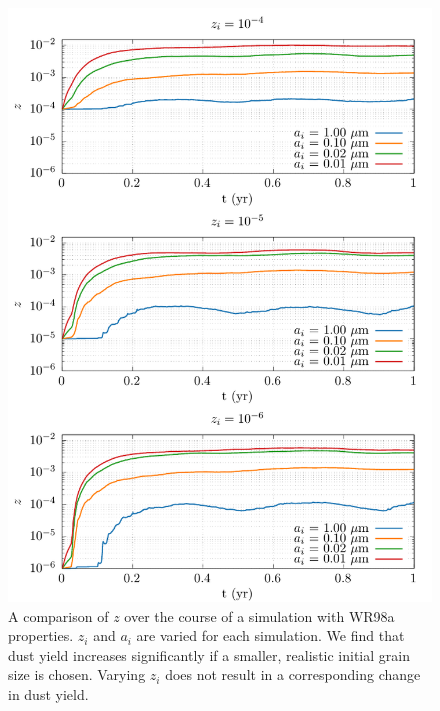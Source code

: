 \begin{figure}[p]
  \centering
  \includegraphics{assets/a_z_tweaking/z.pdf}
  \caption[$z_i$ and $a_i$ parameter tweaking]{A comparison of $z$ over the course of a simulation with WR98a properties. $z_i$ and $a_i$ are varied for each simulation. We find that dust yield increases significantly if a smaller, realistic initial grain size is chosen. Varying $z_i$ does not result in a corresponding change in dust yield.}
  \label{fig:azweak_z}
\end{figure}

